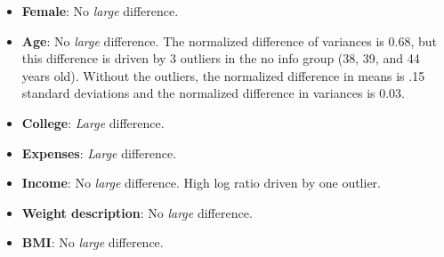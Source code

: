 \documentclass[12pt]{article}
\begin{document}
\begin{itemize}
  \item \textbf{Female}: No \emph{large} difference.

  \item \textbf{Age}: No \emph{large} difference.
  The normalized difference of variances is 0.68, but this difference is driven by 3 outliers in the no info group (38, 39, and 44 years old). Without the outliers, the normalized difference in means is .15 standard deviations and the normalized difference in variances is 0.03.

  \item \textbf{College}: \emph{Large} difference.

  \item \textbf{Expenses}: \emph{Large} difference.

  \item \textbf{Income}: No \emph{large} difference.
  High log ratio driven by one outlier.

  \item \textbf{Weight description}: No \emph{large} difference.

  \item \textbf{BMI}: No \emph{large} difference.
\end{itemize}
\end{document}
